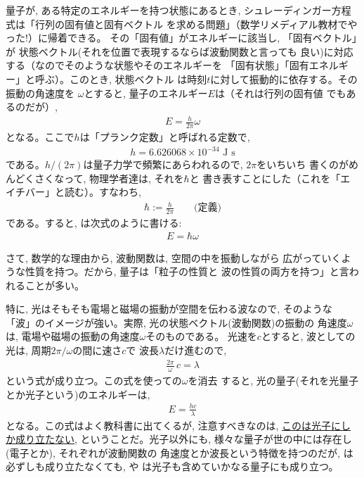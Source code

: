 量子が, ある特定のエネルギーを持つ状態にあるとき, 
シュレーディンガー方程式は「行列の固有値と固有ベクトル
を求める問題」（数学リメディアル教材でやった!）に帰着できる。
その「固有値」がエネルギーに該当し, 「固有ベクトル」が
状態ベクトル(それを位置で表現するならば波動関数と言っても
良い)に対応する（なのでそのような状態やそのエネルギーを
「固有状態」「固有エネルギー」と呼ぶ）。このとき, 状態ベクトル
は時刻$t$に対して振動的に依存する。その振動の角速度を
$\omega$とすると, 量子のエネルギー$E$は（それは行列の固有値
でもあるのだが）, 
\begin{eqnarray}
E=\frac{h}{2\pi}\omega\label{eq:E_h_omega}
\end{eqnarray}
となる。ここで$h$は「プランク定数」と呼ばれる定数で, 
\begin{eqnarray}
h=6.626068\times10^{-34}\text{ J s}
\end{eqnarray}
である。$h/(2\pi)$は量子力学で頻繁にあらわれるので, $2\pi$をいちいち
書くのがめんどくさくなって, 物理学者達は, それを$\hbar$と
書き表すことにした（これを「エイチバー」と読む）。すなわち, 
\begin{eqnarray}
\hbar:=\frac{h}{2\pi}\quad\quad\text{(定義)}\label{eq:def_hbar}
\end{eqnarray}
である。すると, は次式のように書ける:
\begin{eqnarray}
E=\hbar \omega\label{eq:E_hbar_omega}
\end{eqnarray}

さて, 数学的な理由から, 波動関数は, 空間の中を振動しながら
広がっていくような性質を持つ。だから, 量子は「粒子の性質と
波の性質の両方を持つ」と言われることが多い。

特に, 光はそもそも電場と磁場の振動が空間を伝わる波なので, そのような
「波」のイメージが強い。実際, 光の状態ベクトル(波動関数)の振動の
角速度$\omega$は, 電場や磁場の振動の角速度$\omega$そのものである。
光速を$c$とすると, 波としての光は, 周期$2\pi/\omega$の間に速さ$c$で
波長$\lambda$だけ進むので, 
\begin{eqnarray}
\frac{2\pi}{\omega}\,c=\lambda
\end{eqnarray}
という式が成り立つ。この式を使っての$\omega$を消去
すると, 光の量子(それを光量子とか光子という)のエネルギーは, 
\begin{eqnarray}
E=\frac{hc}{\lambda}\label{eq:E_photon}
\end{eqnarray}
となる。この式はよく教科書に出てくるが, 注意すべきなのは, 
\underline{このは光子にしか成り立たない}, 
ということだ。光子以外にも, 様々な量子が世の中には存在し(電子とか), それぞれが波動関数の
角速度とか波長という特徴を持つのだが, は
必ずしも成り立たなくても, や
は光子も含めていかなる量子にも成り立つ。\mv
